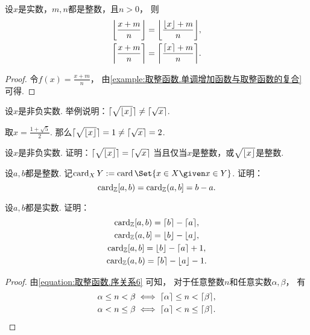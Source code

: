 \begin{example}
设\(x\)是实数，\(m,n\)都是整数，且\(n>0\)，
则\begin{gather}
	\floor*{\frac{x+m}{n}} = \floor*{\frac{\floor{x}+m}{n}}, \\
	\ceil*{\frac{x+m}{n}} = \ceil*{\frac{\ceil{x}+m}{n}}.
\end{gather}
\begin{proof}
令\(f(x) = \frac{x+m}{n}\)，
由\cref{example:取整函数.单调增加函数与取整函数的复合} 可得.
\end{proof}
\end{example}
\begin{example}
设\(x\)是非负实数.
举例说明：\(\lceil\sqrt{\lfloor x\rfloor}\rceil \neq \lceil\sqrt{x}\rceil\).
\begin{solution}
取\(x = \frac{1+\sqrt5}2\).
那么\(\lceil\sqrt{\lfloor x\rfloor}\rceil = 1 \neq \lceil\sqrt{x}\rceil = 2\).
\end{solution}
\end{example}
\begin{example}
设\(x\)是非负实数.
证明：\(\lceil\sqrt{\lfloor x\rfloor}\rceil = \lceil\sqrt{x}\rceil\)
当且仅当\(x\)是整数，或\(\sqrt{\lfloor x\rfloor}\)是整数.
\end{example}
\begin{example}
设\(a,b\)都是整数.
记\(\card_X Y \defeq \card\Set{ x \in X \given x \in Y }\).
证明：\begin{equation*}
	\operatorname{card}_\mathbb{Z} [a,b)
	= \operatorname{card}_\mathbb{Z} (a,b]
	= b-a.
\end{equation*}
\end{example}
\begin{example}
设\(a,b\)都是实数.
证明：\begin{gather*}
	\operatorname{card}_\mathbb{Z} [a,b)
	= \lceil b\rceil - \lceil a\rceil, \\
	\operatorname{card}_\mathbb{Z} (a,b]
	= \lfloor b\rfloor - \lfloor a\rfloor, \\
	\operatorname{card}_\mathbb{Z} [a,b]
	= \lfloor b\rfloor - \lceil a\rceil + 1, \\
	\operatorname{card}_\mathbb{Z} (a,b)
	= \lceil b\rceil - \lfloor a\rfloor - 1.
\end{gather*}
\begin{proof}
由\cref{equation:取整函数.序关系6} 可知，
对于任意整数\(n\)和任意实数\(\alpha,\beta\)，
有\begin{gather*}
	\alpha \leq n < \beta
	\iff
	\lceil\alpha\rceil \leq n < \lceil\beta\rceil, \\
	\alpha < n \leq \beta
	\iff
	\lceil\alpha\rceil < n \leq \lceil\beta\rceil.
\end{gather*}
\let\qed\relax
\end{proof}
\end{example}
